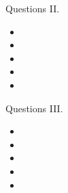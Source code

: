 \documentclass[10pt]{beamer}
\begin{document}

\begin{frame}{Questions II.}
	\begin{itemize}
        \pause{}
		\item
		\pause{}
		\item
		\pause{}
		\item
		\pause{}
		\item
		\pause{}
		\item
	\end{itemize}	
\end{frame}


\begin{frame}{Questions III.}
	\begin{itemize}
        \pause{}
		\item
		\pause{}
		\item
		\pause{}
		\item
		\pause{}
		\item
		\pause{}
		\item
	\end{itemize}	
\end{frame}

  

\end{document}
